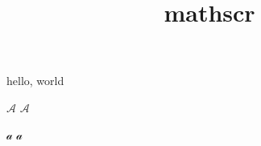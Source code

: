 \documentclass{amsart}
\title{mathscr}
\begin{document}
\maketitle

hello, world

$\mathcal{A}$ $\mathscr{A}$

$\mathcal{a}$ $\mathscr{a}$
\end{document}
